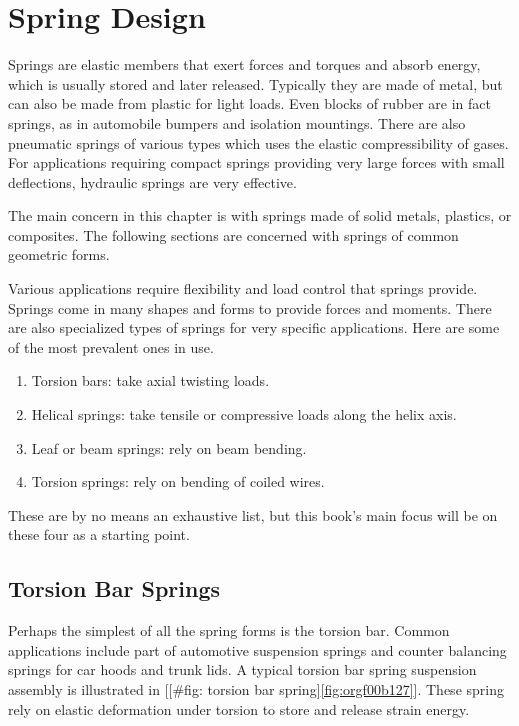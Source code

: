 \documentclass[a4paper,openany,12pt]{book}
\begin{document}
{{\chapter{Spring Design}
\label{sec:org62490c5}
Springs are elastic members that exert forces and torques and absorb
energy, which is usually stored and later released. Typically they are
made of metal, but can also be made from plastic for light loads. Even
blocks of rubber are in fact springs, as in automobile bumpers and
isolation mountings. There are also pneumatic springs of various types
which uses the elastic compressibility of gases. For applications
requiring compact springs providing very large forces with small
deflections, hydraulic springs are very effective.

The main concern in this chapter is with springs made of solid metals,
plastics, or composites. The following sections are concerned with
springs of common geometric forms.

Various applications require flexibility and load control that springs
provide. Springs come in many shapes and forms to provide forces and
moments. There are also specialized types of springs for very specific
applications. Here are some of the most prevalent ones in use.

\begin{enumerate}
\item Torsion bars: take axial twisting loads.

\item Helical springs: take tensile or compressive loads along the helix
axis.

\item Leaf or beam springs: rely on beam bending.

\item Torsion springs: rely on bending of coiled wires.
\end{enumerate}

These are by no means an exhaustive list, but this book's main focus
will be on these four as a starting point.

\section{Torsion Bar Springs}
\label{sec:org83cf669}
Perhaps the simplest of all the spring forms is the torsion bar. Common
applications include part of automotive suspension springs and counter
balancing springs for car hoods and trunk lids. A typical torsion bar
spring suspension assembly is illustrated in
[[\#fig: torsion bar spring]\ref{fig:orgf00b127}]. These spring
rely on elastic deformation under torsion to store and release strain
energy.


}}
\end{document}
